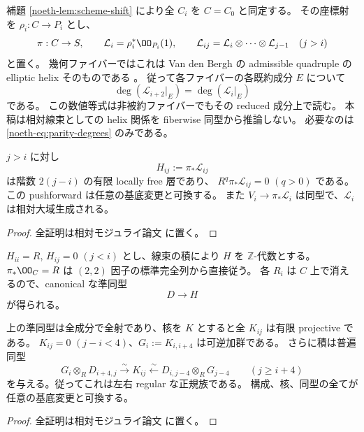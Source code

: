 補題 \ref{noeth-lem:scheme-shift} により全 $C_i$ を $C=C_0$ と同定する。
その座標射を $\rho_i:C\to P_i$ とし、
\[
 \pi:C\to S,\qquad \mathcal L_i=\rho_i^*\OO_{P_i}(1),\qquad
 \mathcal L_{ij}=\mathcal L_i\otimes\cdots\otimes\mathcal L_{j-1}\quad(j>i)
\]
と置く。
幾何ファイバーではこれは Van den Bergh の admissible quadruple の elliptic helix そのものである
\cite[\S5.4, Lemma 5.5.1, Theorem 5.5.10]{VdB2011}。
従って各ファイバーの各既約成分 $E$ について
\begin{equation}\label{noeth-eq:parity-degrees}
 \deg(\mathcal L_{i+2}|_E)=\deg(\mathcal L_i|_E)
\end{equation}
である。
この数値等式は非被約ファイバーでもその reduced 成分上で読む。
本稿は相対線束としての helix 関係を fiberwise 同型から推論しない。
必要なのは \eqref{noeth-eq:parity-degrees} のみである。

\begin{lemma}\label{noeth-lem:cohomology-bc}
$j>i$ に対し
\[
 H_{ij}:=\pi_*\mathcal L_{ij}
\]
は階数 $2(j-i)$ の有限 locally free 層であり、
$R^{q}\pi_*\mathcal L_{ij}=0$ $(q>0)$ である。
この pushforward は任意の基底変更と可換する。
また $V_i\to\pi_*\mathcal L_i$ は同型で、$\mathcal L_i$ は相対大域生成される。
\end{lemma}

\begin{proof}
全証明は相対モジュライ論文 \cite[\texttt{relative_cubic_noetherian}]{QuadricModuli2026} に置く。
\end{proof}

$H_{ii}=R$, $H_{ij}=0$ $(j<i)$ とし、線束の積により $H$ を $\mathbb Z$-代数とする。
$\pi_*\OO_C=R$ は $(2,2)$ 因子の標準完全列から直接従う。
各 $R_i$ は $C$ 上で消えるので、canonical な準同型
\[
 D\longrightarrow H
\]
が得られる。

\begin{proposition}\label{noeth-prop:normal-family}
上の準同型は全成分で全射であり、核を $K$ とすると全 $K_{ij}$ は有限 projective である。
$K_{ij}=0$ $(j-i<4)$、$G_i:=K_{i,i+4}$ は可逆加群である。
さらに積は普遍同型
\begin{equation}\label{noeth-eq:normal-family}
 G_i\otimes_R D_{i+4,j}\xrightarrow{\sim}K_{ij}
 \xleftarrow{\sim}D_{i,j-4}\otimes_R G_{j-4}
 \qquad(j\ge i+4)
\end{equation}
を与える。従ってこれは左右 regular な正規族である。
構成、核、同型の全てが任意の基底変更と可換する。
\end{proposition}

\begin{proof}
全証明は相対モジュライ論文 \cite[\texttt{relative_cubic_noetherian}]{QuadricModuli2026} に置く。
\end{proof}

